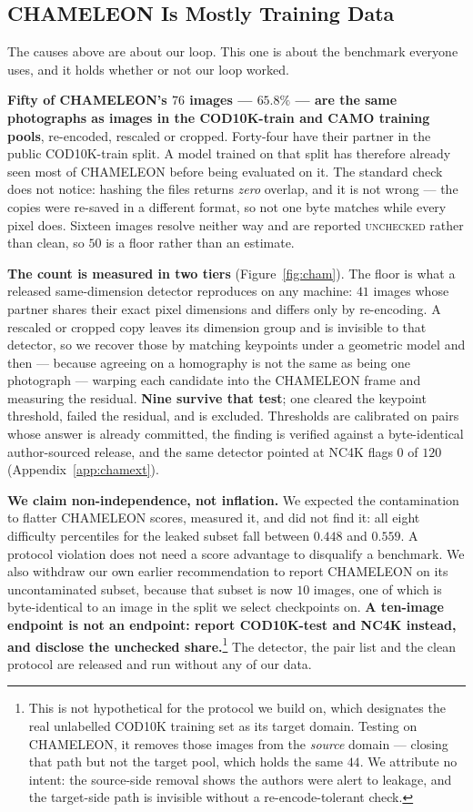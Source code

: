 \documentclass{article} %
\begin{document}
\subsection{CHAMELEON Is Mostly Training Data}
\label{sec:contamination}
The causes above are about our loop. This one is about the benchmark everyone uses, and it holds
whether or not our loop worked.

\textbf{Fifty of CHAMELEON's $76$ images --- $65.8\%$ --- are the same photographs as images in the
COD10K-train and CAMO training pools}, re-encoded, rescaled or cropped. Forty-four have their
partner in the public COD10K-train split. A model trained on that split has therefore already seen
most of CHAMELEON before being evaluated on it. The standard check does not notice: hashing the
files returns \emph{zero} overlap, and it is not wrong --- the copies were re-saved in a different
format, so not one byte matches while every pixel does. Sixteen images resolve neither way and are
reported \textsc{unchecked} rather than clean, so $50$ is a floor rather than an estimate.

\textbf{The count is measured in two tiers} (Figure~\ref{fig:cham}). The floor is what a released
same-dimension detector reproduces on any machine: $41$ images whose partner shares their exact
pixel dimensions and differs only by re-encoding. A rescaled or cropped copy leaves its dimension
group and is invisible to that detector, so we recover those by matching keypoints under a geometric
model and then --- because agreeing on a homography is not the same as being one photograph ---
warping each candidate into the CHAMELEON frame and measuring the residual. \textbf{Nine survive
that test}; one cleared the keypoint threshold, failed the residual, and is excluded. Thresholds are
calibrated on pairs whose answer is already committed, the finding is verified against a
byte-identical author-sourced release, and the same detector pointed at NC4K flags $0$ of $120$
(Appendix~\ref{app:chamext}).

\textbf{We claim non-independence, not inflation.} We expected the contamination to flatter
CHAMELEON scores, measured it, and did not find it: all eight difficulty percentiles for the leaked
subset fall between $0.448$ and $0.559$. A protocol violation does not need a score advantage to
disqualify a benchmark. We also withdraw our own earlier recommendation to report CHAMELEON on its
uncontaminated subset, because that subset is now $10$ images, one of which is byte-identical to an
image in the split we select checkpoints on. \textbf{A ten-image endpoint is not an endpoint:
report COD10K-test and NC4K instead, and disclose the unchecked share.}\footnote{This is not
hypothetical for the protocol we build on, which designates the real unlabelled COD10K training set
as its target domain. Testing on CHAMELEON, it removes those images from the \emph{source} domain
--- closing that path but not the target pool, which holds the same $44$. We attribute no intent:
the source-side removal shows the authors were alert to leakage, and the target-side path is
invisible without a re-encode-tolerant check.} The detector, the pair list and the clean protocol
are released and run without any of our data.
\end{document}
